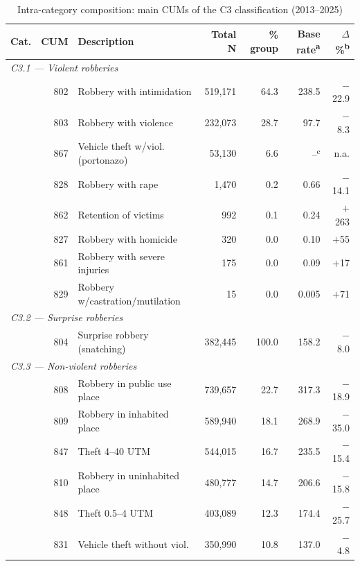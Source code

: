 \documentclass[pdflatex,sn-basic]{sn-jnl}
\begin{document}
\begin{table}[htbp]
\centering
\caption{Intra-category composition: main CUMs of the C3 classification (2013--2025)}
\label{tab:cum}
\footnotesize
\begin{tabular}{lrp{5cm}rrrr}
\toprule
\textbf{Cat.} & \textbf{CUM} & \textbf{Description} & \textbf{Total N} & \textbf{\% group} & \textbf{Base rate\textsuperscript{a}} & \textbf{$\Delta$\%\textsuperscript{b}} \\
\midrule
\multicolumn{7}{l}{\textit{C3.1 --- Violent robberies}} \\
 & 802 & Robbery with intimidation        & 519,171 & 64.3 & 238.5 & $-$22.9 \\
 & 803 & Robbery with violence             & 232,073 & 28.7 &  97.7 & $-$8.3  \\
 & 867 & Vehicle theft w/viol. (portonazo) & 53,130 & 6.6 & --\textsuperscript{c} & n.a. \\
 & 828 & Robbery with rape           &   1,470 &  0.2 &  0.66 & $-$14.1 \\
 & 862 & Retention of victims      &     992 &  0.1 &  0.24 & $+$263  \\
 & 827 & Robbery with homicide             &     320 &  0.0 &  0.10 & $+$55   \\
 & 861 & Robbery with severe injuries       &     175 &  0.0 &  0.09 & $+$17   \\
 & 829 & Robbery w/castration/mutilation &   15  &  0.0 & 0.005 & $+$71   \\
\midrule
\multicolumn{7}{l}{\textit{C3.2 --- Surprise robberies}} \\
 & 804 & Surprise robbery (snatching)   & 382,445 & 100.0 & 158.2 & $-$8.0 \\
\midrule
\multicolumn{7}{l}{\textit{C3.3 --- Non-violent robberies}} \\
 & 808 & Robbery in public use place   & 739,657 & 22.7 & 317.3 & $-$18.9 \\
 & 809 & Robbery in inhabited place        & 589,940 & 18.1 & 268.9 & $-$35.0 \\
 & 847 & Theft 4--40 UTM               & 544,015 & 16.7 & 235.5 & $-$15.4 \\
 & 810 & Robbery in uninhabited place     & 480,777 & 14.7 & 206.6 & $-$15.8 \\
 & 848 & Theft 0.5--4 UTM              & 403,089 & 12.3 & 174.4 & $-$25.7 \\
 & 831 & Vehicle theft without viol.  & 350,990 & 10.8 & 137.0 & $-$4.8  \\

\end{tabular}
\end{table}
\end{document}
